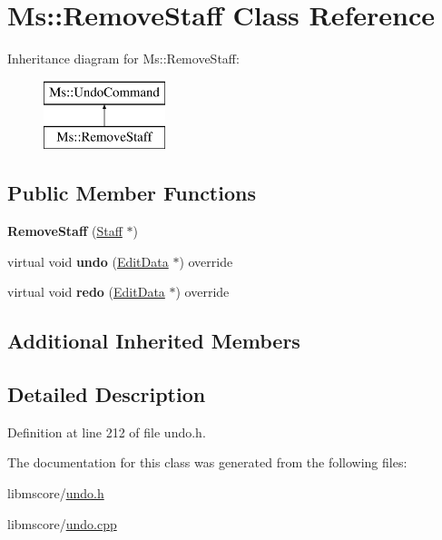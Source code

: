 \hypertarget{class_ms_1_1_remove_staff}{}\section{Ms\+:\+:Remove\+Staff Class Reference}
\label{class_ms_1_1_remove_staff}
Inheritance diagram for Ms\+:\+:Remove\+Staff\+:\begin{figure}[H]
\begin{center}
\leavevmode
\includegraphics[height=2.000000cm]{class_ms_1_1_remove_staff}
\end{center}
\end{figure}
\subsection*{Public Member Functions}
\begin{DoxyCompactItemize}
\item 
\mbox{\label{class_ms_1_1_remove_staff_af86711c1b1cc42d49966e30507ac924d}} 
{\bfseries Remove\+Staff} (\hyperlink{class_ms_1_1_staff}{Staff} $\ast$)
\item 
\mbox{\label{class_ms_1_1_remove_staff_a289a8e8724d3abc2fd61716c8cc9a8a5}} 
virtual void {\bfseries undo} (\hyperlink{class_ms_1_1_edit_data}{Edit\+Data} $\ast$) override
\item 
\mbox{\label{class_ms_1_1_remove_staff_a5ad5b5e6d89c9a533719bdf02b43a2a2}} 
virtual void {\bfseries redo} (\hyperlink{class_ms_1_1_edit_data}{Edit\+Data} $\ast$) override
\end{DoxyCompactItemize}
\subsection*{Additional Inherited Members}


\subsection{Detailed Description}


Definition at line 212 of file undo.\+h.



The documentation for this class was generated from the following files\+:\begin{DoxyCompactItemize}
\item 
libmscore/\hyperlink{undo_8h}{undo.\+h}\item 
libmscore/\hyperlink{undo_8cpp}{undo.\+cpp}\end{DoxyCompactItemize}
